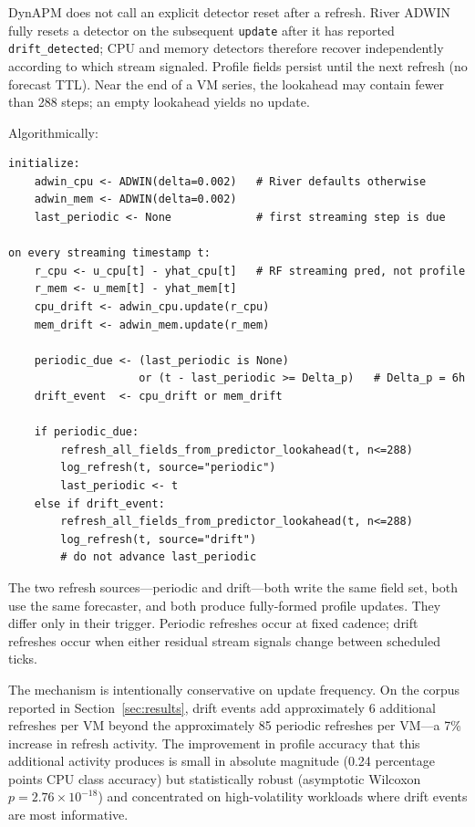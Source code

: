 \documentclass[manuscript,screen,review,anonymous]{acmart}
\begin{document}
DynAPM does not call an explicit detector reset after a refresh.
River ADWIN fully resets a detector on the subsequent
\texttt{update} after it has reported \texttt{drift\_detected};
CPU and memory detectors therefore recover independently
according to which stream signaled. Profile fields persist until
the next refresh (no forecast TTL). Near the end of a VM series,
the lookahead may contain fewer than 288 steps; an empty
lookahead yields no update.

Algorithmically:
\begin{verbatim}
initialize:
    adwin_cpu <- ADWIN(delta=0.002)   # River defaults otherwise
    adwin_mem <- ADWIN(delta=0.002)
    last_periodic <- None             # first streaming step is due

on every streaming timestamp t:
    r_cpu <- u_cpu[t] - yhat_cpu[t]   # RF streaming pred, not profile
    r_mem <- u_mem[t] - yhat_mem[t]
    cpu_drift <- adwin_cpu.update(r_cpu)
    mem_drift <- adwin_mem.update(r_mem)

    periodic_due <- (last_periodic is None)
                    or (t - last_periodic >= Delta_p)   # Delta_p = 6h
    drift_event  <- cpu_drift or mem_drift

    if periodic_due:
        refresh_all_fields_from_predictor_lookahead(t, n<=288)
        log_refresh(t, source="periodic")
        last_periodic <- t
    else if drift_event:
        refresh_all_fields_from_predictor_lookahead(t, n<=288)
        log_refresh(t, source="drift")
        # do not advance last_periodic
\end{verbatim}

The two refresh sources---periodic and drift---both write the
same field set, both use the same forecaster, and both produce
fully-formed profile updates. They differ only in their trigger.
Periodic refreshes occur at fixed cadence; drift refreshes occur
when either residual stream signals change between scheduled ticks.

The mechanism is intentionally conservative on update frequency.
On the corpus reported in Section~\ref{sec:results}, drift events
add approximately 6 additional refreshes per VM beyond the
approximately 85 periodic refreshes per VM---a 7\% increase in
refresh activity. The improvement in profile accuracy that this
additional activity produces is small in absolute magnitude
(0.24 percentage points CPU class accuracy) but statistically
robust (asymptotic Wilcoxon $p = 2.76 \times 10^{-18}$) and
concentrated on high-volatility workloads where drift events are
most informative.
\end{document}
